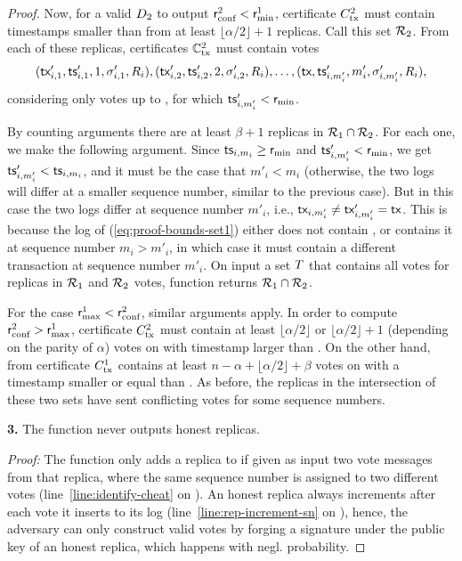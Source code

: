 \begin{proof}
	Now, for a valid $D_2$ to output $\textsf{r}_\text{conf}^2 < \textsf{r}_\text{min}^1$, certificate $C_\text{tx}^2$ must contain timestamps smaller than \rmin from at least $\lfloor \alpha / 2 \rfloor + 1$ replicas. Call this set $\mathcal{R}_2$. From each of these replicas, certificates $\mathbb{C}_\text{tx}^2$ must contain votes
	\begin{equation}\label{eq:proof-bounds-set2}
		(\textsf{tx}'_{i,1}, \textsf{ts}'_{i,1}, 1, \sigma'_{i,1}, R_i), (\textsf{tx}'_{i,2}, \textsf{ts}'_{i,2}, 2, \sigma'_{i,2}, R_i), \ldots, (\textsf{tx}, \textsf{ts}'_{i, m'_i}, m'_i, \sigma'_{i, m'_i}, R_i),
	\end{equation}
	considering only votes up to \tx, for which $\textsf{ts}'_{i, m'_i} < \textsf{r}_\text{min}$.

	By counting arguments there are at least $\beta + 1$ replicas in $\mathcal{R}_1 \cap \mathcal{R}_2$.
	For each one, we make the following argument. Since $\textsf{ts}_{i, m_i} \geq \textsf{r}_\text{min}$ and $\textsf{ts}'_{i, m'_i} < \textsf{r}_\text{min}$, we get $\textsf{ts}'_{i, m'_i} < \textsf{ts}_{i, m_i}$, and it must be the case that $m'_i < m_i$ (otherwise, the two logs will differ at a smaller sequence number, similar to the previous case).
	But in this case the two logs differ at sequence number $m'_i$, i.e., $\textsf{tx}_{i,m'_i} \neq \textsf{tx}'_{i,m'_i} = \textsf{tx}$.
	This is because the log of (\ref{eq:proof-bounds-set1}) either does not contain \tx, or contains it at sequence number $m_i > m'_i$, in which case it must contain a different transaction at sequence number $m'_i$.
	On input a set $T$ that contains all votes for replicas in $\mathcal{R}_1$ and $\mathcal{R}_2$ votes, function \identify{\tran} returns $\mathcal{R}_1 \cap \mathcal{R}_2$.

	For the case $\textsf{r}_\text{max}^1 < \textsf{r}_\text{conf}^2$, similar arguments apply.
	In order to compute $\textsf{r}_\text{conf}^2 > \textsf{r}_\text{max}^1$, certificate $C_\text{tx}^2$ must contain at least $\lfloor \alpha / 2 \rfloor$ or $\lfloor \alpha / 2 \rfloor + 1$ (depending on the parity of $\alpha$) votes on \tx with timestamp larger than \rmax.
	On the other hand, from  certificate $C_\text{tx}^1$ contains at least $n - \alpha + \lfloor \alpha / 2 \rfloor + \beta$ votes on \tx with a timestamp smaller or equal than \rmax.
	As before, the replicas in the intersection of these two sets have sent conflicting votes for some sequence numbers.

	\textbf{3.}
	The \identify{} function never outputs honest replicas.

	\noindent
	\emph{Proof:} The function only adds a replica to \cheaters if given as input two vote messages from that replica, where the same sequence number is assigned to two different votes (line~\ref{line:identify-cheat} on ). An honest replica always increments \nextsn after each vote it inserts to its log (line~\ref{line:rep-increment-sn} on ), hence, the adversary can only construct valid votes by forging a signature under the public key of an honest replica, which happens with negl. probability.
\end{proof}
